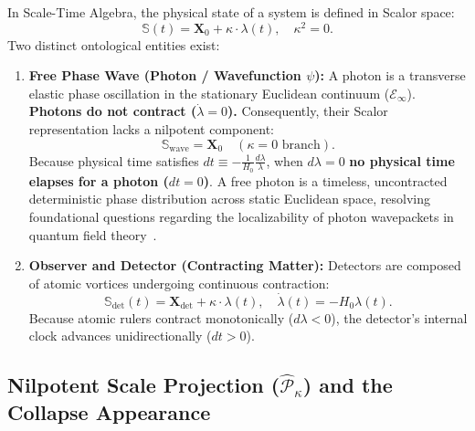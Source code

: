 In Scale-Time Algebra, the physical state of a system is defined in Scalor space:
\begin{equation}
    \mathbb{S}(t) = \mathbf{X}_0 + \kappa \cdot \lambda(t), \quad \kappa^2 = 0.
    \label{eq:skalor_durum_olcum}
\end{equation}
Two distinct ontological entities exist:
\begin{enumerate}
    \item \textbf{Free Phase Wave (Photon / Wavefunction $\psi$):} A photon is a transverse elastic phase oscillation in the stationary Euclidean continuum ($\mathcal{E}_\infty$). \textbf{Photons do not contract ($\dot{\lambda} = 0$).} Consequently, their Scalor representation lacks a nilpotent component:
          \begin{equation}
              \mathbb{S}_{\mathrm{wave}} = \mathbf{X}_0 \quad (\kappa = 0 \text{ branch}).
              \label{eq:foton_skalor}
          \end{equation}
          Because physical time satisfies $dt \equiv -\frac{1}{H_0}\frac{d\lambda}{\lambda}$, when $d\lambda = 0$ \textbf{no physical time elapses for a photon ($dt = 0$)}. A free photon is a timeless, uncontracted deterministic phase distribution across static Euclidean space, resolving foundational questions regarding the localizability of photon wavepackets in quantum field theory~\cite{paul1982}.
    \item \textbf{Observer and Detector (Contracting Matter):} Detectors are composed of atomic vortices undergoing continuous contraction:
          \begin{equation}
              \mathbb{S}_{\mathrm{det}}(t) = \mathbf{X}_{\mathrm{det}} + \kappa \cdot \lambda(t), \quad \dot{\lambda}(t) = -H_0 \lambda(t).
              \label{eq:dedektor_skalor}
          \end{equation}
          Because atomic rulers contract monotonically ($d\lambda < 0$), the detector's internal clock advances unidirectionally ($dt > 0$).
\end{enumerate}

\subsection{Nilpotent Scale Projection (\texorpdfstring{$\hat{\mathcal{P}}_\kappa$}{P_kappa}) and the Collapse Appearance}
\label{sec:nilpotent_izdusum}

